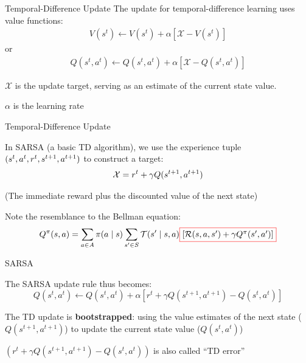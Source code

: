 \begin{frame}{Temporal-Difference Update}
    The update for temporal-difference learning uses value functions:
    \vspace{0pt}
    \begin{align*}
        V(s^{t}) \gets V(s^{t}) + \alpha \left[\mathcal{X} - V(s^{t})\right]
    \end{align*}
    or 
    \vspace{0pt}
    \begin{align*}
        Q(s^{t}, a^{t}) \gets Q(s^{t}, a^{t})  + \alpha \left[\mathcal{X} - Q(s^{t}, a^{t})\right]
    \end{align*}
	\blist
    	\item $\mathcal{X}$ is the update target, serving as an estimate of the current state value. 
    	\item $\alpha$ is the learning rate
    \elist
\end{frame}

\begin{frame}{Temporal-Difference Update}
    
    In SARSA (a basic TD algorithm), we use the experience tuple $(s^{t}, a^{t}, r^{t}, s^{t+1}, a^{t+1})$ to construct a target:
    \begin{align*}
        \mathcal{X} = r^t + \gamma Q(s^{t+1}, a^{t+1})
    \end{align*}
    
    (The immediate reward plus the discounted value of the next state)
    
    Note the resemblance to the Bellman equation:
    \begin{align*}
        Q^{\pi}(\st, \ac) = \sum_{\ac \in \Ac} \pi(\ac \mid \st) \sum_{\st' \in \St} \Stf(\st' \mid \st, \ac) \Cboxed{red}{$\left[\Rew(\st, \ac, \st') + \gamma Q^{\pi}(s', a')\right]$}
    \end{align*}
\end{frame}

\begin{frame}{SARSA}
    
The SARSA update rule thus becomes:
$$
  Q(s^t, a^t) \leftarrow Q(s^t, a^t) + \alpha[r^t + \gamma Q(s^{t+1}, a^{t+1})- Q(s^t,a^t)] 
$$

\vspace{5pt}

\blist
	\itemsep=10pt
	\item The TD update is \textbf{bootstrapped}: using the value estimates of the next state ($Q(s^{t+1}, a^{t+1})$) to update the current state value ($Q(s^t,a^t)$)
    \item $\left( r^t + \gamma Q(s^{t+1}, a^{t+1})- Q(s^t,a^t) \right)$ is also called ``TD error''
\elist

\end{frame}

